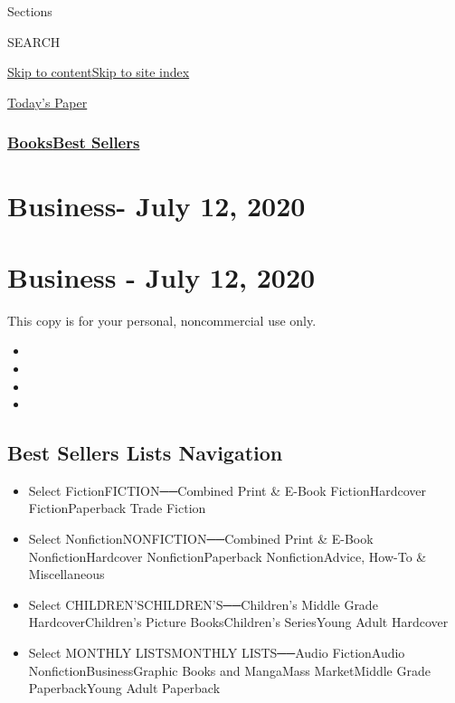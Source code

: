 Sections

SEARCH

\protect\hyperlink{site-content}{Skip to
content}\protect\hyperlink{site-index}{Skip to site index}

\href{https://myaccount.nytimes3xbfgragh.onion/auth/login?response_type=cookie\&client_id=vi}{}

\href{https://www.nytimes3xbfgragh.onion/section/todayspaper}{Today's
Paper}

\hypertarget{booksbest-sellers}{%
\subsubsection{\texorpdfstring{\href{/section/books/}{Books}\textbar{}\href{/books/best-sellers/}{Best
Sellers}}{Books\textbar{}Best Sellers}}\label{booksbest-sellers}}

\hypertarget{business--july-12-2020}{%
\section{Business- July 12, 2020}\label{business--july-12-2020}}

\hypertarget{business---july-12-2020}{%
\section{Business - July 12, 2020}\label{business---july-12-2020}}

This copy is for your personal, noncommercial use only.

\begin{itemize}
\item
\item
\item
\item
\end{itemize}

\hypertarget{best-sellers-lists-navigation}{%
\subsection{Best Sellers Lists
Navigation}\label{best-sellers-lists-navigation}}

\begin{itemize}
\tightlist
\item
  Select FictionFICTION──Combined Print \& E-Book FictionHardcover
  FictionPaperback Trade Fiction
\item
  Select NonfictionNONFICTION──Combined Print \& E-Book
  NonfictionHardcover NonfictionPaperback NonfictionAdvice, How-To \&
  Miscellaneous
\item
  Select CHILDREN'SCHILDREN'S──Children's Middle Grade
  HardcoverChildren's Picture BooksChildren's SeriesYoung Adult
  Hardcover
\item
  Select MONTHLY LISTSMONTHLY LISTS──Audio FictionAudio
  NonfictionBusinessGraphic Books and MangaMass MarketMiddle Grade
  PaperbackYoung Adult Paperback
\end{itemize}

